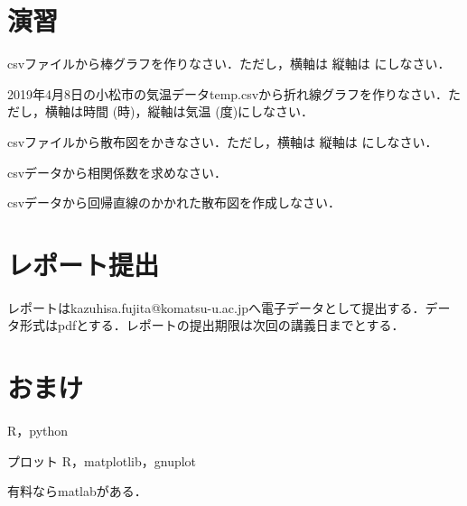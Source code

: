 \section{演習}

\practice
csvファイルから棒グラフを作りなさい．ただし，横軸は 縦軸は にしなさい．

\practice
2019年4月8日の小松市の気温データtemp.csvから折れ線グラフを作りなさい．ただし，横軸は時間 (時)，縦軸は気温 (度)にしなさい．

\practice
csvファイルから散布図をかきなさい．ただし，横軸は 縦軸は にしなさい．

\practice
csvデータから相関係数を求めなさい．

\practice
csvデータから回帰直線のかかれた散布図を作成しなさい．

\section{レポート提出}

レポートはkazuhisa.fujita@komatsu-u.ac.jpへ電子データとして提出する．データ形式はpdfとする．レポートの提出期限は次回の講義日までとする．

\section{おまけ}

R，python

プロット
R，matplotlib，gnuplot


有料ならmatlabがある．
